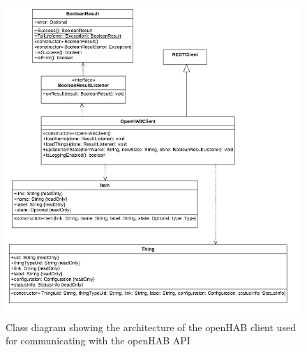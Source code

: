 \begin{figure}[h!]
\centering
\includegraphics[width=\textwidth]{images/uml-openhab-client}
\caption{Class diagram showing the architecture of the openHAB client used for communicating with the openHAB API}
\label{fig:communication-with-openhab:class-diagram-openhab-client}
\end{figure}

